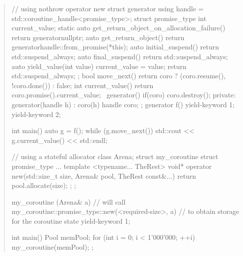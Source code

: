 \begin{quote}
\enterexample
\begin{codeblock}
// using nothrow operator new
struct generator {
  using handle = std::coroutine_handle<promise_type>;
  struct promise_type {
    int current_value;
    static auto get_return_object_on_allocation_failure() { return generator{nullptr}; }
    auto get_return_object() { return generator{handle::from_promise(*this)}; }
    auto initial_suspend() { return std::suspend_always{}; }
    auto final_suspend() { return std::suspend_always{}; }
    auto yield_value(int value) { 
      current_value = value; 
      return std::suspend_always{};
    }
  };
  bool move_next() { return coro ? (coro.resume(), !coro.done()) : false; }
  int current_value() { return coro.promise().current_value; }
  ~generator() { if(coro) coro.destroy(); }
private:
  generator(handle h) : coro(h) {}
  handle coro;
};
generator f() { yield-keyword 1;  yield-keyword 2; }
 
int main() {
  auto g = f();
  while (g.move_next()) std::cout << g.current_value() << std::endl;
}

\end{codeblock}
\exitexample




%

\pnum
\enterexample
\begin{codeblock}
  // using a stateful allocator
  class Arena;
  struct my_coroutine {
    struct promise_type {
      ...
      template <typename... TheRest>
      void* operator new(std::size_t size, Arena& pool, TheRest const&...) {
        return pool.allocate(size);
      }
    };
  };
  
  my_coroutine (Arena& a) {
    // will call my_coroutine::promise_type::new(<required-size>, a)
    // to obtain storage for the coroutine state
    yield-keyword 1;
  }
  
  int main() {
    Pool memPool;
    for (int i = 0; i < 1'000'000; ++i)
    my_coroutine(memPool);
  };
\end{codeblock}
\exitexample


\end{quote}